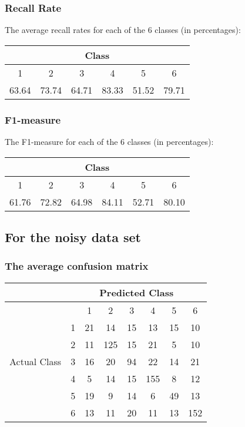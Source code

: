 \documentclass[a4paper,11pt]{article}
\begin{document}
\subsubsection{Recall Rate}

The average recall rates for each of the 6 classes (in percentages):

\begin{center}
 \begin{tabular}{| c | c | c | c | c | c |} 
 \hline
 \multicolumn{6}{|c|}{Class} \\
 \hline
  1 & 2 & 3 & 4 & 5 & 6 \\  [1ex]
 \hline
 63.64 & 73.74 & 64.71 & 83.33 & 51.52 & 79.71 \\ 
 \hline
 \end{tabular}
\end{center}

\subsubsection{F1-measure}

The F1-measure for each of the 6 classes (in percentages):

\begin{center}
 \begin{tabular}{| c | c | c | c | c | c |} 
 \hline
 \multicolumn{6}{|c|}{Class} \\
 \hline
  1 & 2 & 3 & 4 & 5 & 6 \\  [1ex]
 \hline
 61.76 & 72.82 & 64.98 & 84.11 & 52.71 & 80.10 \\ 
 \hline
 \end{tabular}
\end{center}

\subsection{For the noisy data set}

\subsubsection{The average confusion matrix}

\begin{center}
 \begin{tabular}{| c |p{0.5cm} | c | c | c | c | c | c|} 
 \hline
   & \multicolumn{7}{|c|}{Predicted Class} \\
  \hline
 \multirow{7}{*}{Actual Class} &  & 1 & 2 & 3 & 4 & 5 & 6 \\  [1ex]
 \cline{2-8}
 & 1 & 21 & 14 & 15 & 13 & 15 & 10 \\ 
 \cline{2-8}
 & 2 & 11 & 125 & 15 & 21 & 5 & 10  \\
 \cline{2-8}
 & 3 & 16 & 20 & 94 & 22 & 14 & 21 \\
 \cline{2-8}
 & 4 & 5 & 14 & 15 & 155 & 8 & 12 \\
 \cline{2-8}
 & 5 & 19 & 9 & 14 & 6 & 49 & 13\\ 
 \cline{2-8}
 & 6 & 13 & 11 & 20 & 11 & 13 & 152 \\ 
 \hline

\end{tabular}
\end{center}
\end{document}
